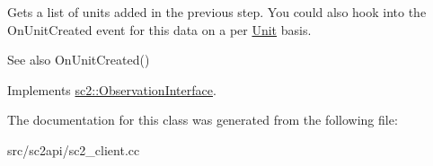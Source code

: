 Gets a list of units added in the previous step. You could also hook into the On\+Unit\+Created event for this data on a per \hyperlink{classsc2_1_1_unit}{Unit} basis. \begin{DoxySeeAlso}{See also}
On\+Unit\+Created() 
\end{DoxySeeAlso}


Implements \hyperlink{classsc2_1_1_observation_interface_a656f51b87f1fafeeff37206345793476}{sc2\+::\+Observation\+Interface}.



The documentation for this class was generated from the following file\+:\begin{DoxyCompactItemize}
\item 
src/sc2api/sc2\+\_\+client.\+cc\end{DoxyCompactItemize}
